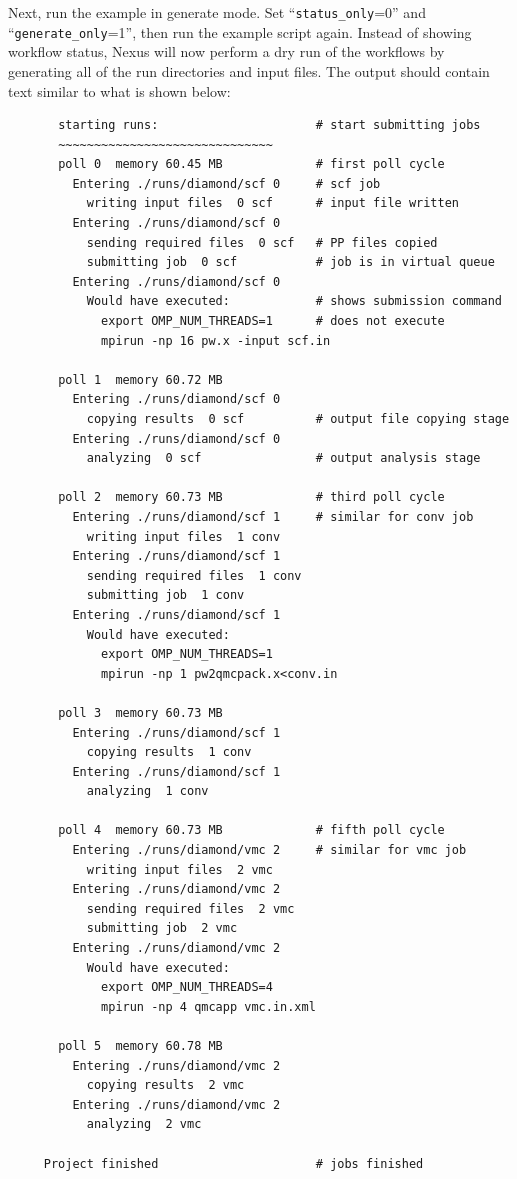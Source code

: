\documentclass[oneside,11pt]{memoir}
\numberwithin{equation}{section}
\begin{document}
Next, run the example in generate mode.  Set ``\texttt{status\_only}=0'' and ``\texttt{generate\_only}=1'', then run the example script again.  Instead of showing workflow status, Nexus will now perform a dry run of the workflows by generating all of the run directories and input files.  The output should contain text similar to what is shown below:
\begin{shaded}
\begin{verbatim}
       starting runs:                      # start submitting jobs
       ~~~~~~~~~~~~~~~~~~~~~~~~~~~~~~ 
       poll 0  memory 60.45 MB             # first poll cycle
         Entering ./runs/diamond/scf 0     # scf job
           writing input files  0 scf      # input file written
         Entering ./runs/diamond/scf 0 
           sending required files  0 scf   # PP files copied
           submitting job  0 scf           # job is in virtual queue
         Entering ./runs/diamond/scf 0 
           Would have executed:            # shows submission command
             export OMP_NUM_THREADS=1      # does not execute
             mpirun -np 16 pw.x -input scf.in 
     
       poll 1  memory 60.72 MB 
         Entering ./runs/diamond/scf 0 
           copying results  0 scf          # output file copying stage
         Entering ./runs/diamond/scf 0 
           analyzing  0 scf                # output analysis stage
     
       poll 2  memory 60.73 MB             # third poll cycle
         Entering ./runs/diamond/scf 1     # similar for conv job
           writing input files  1 conv 
         Entering ./runs/diamond/scf 1 
           sending required files  1 conv 
           submitting job  1 conv 
         Entering ./runs/diamond/scf 1 
           Would have executed:  
             export OMP_NUM_THREADS=1
             mpirun -np 1 pw2qmcpack.x<conv.in 
     
       poll 3  memory 60.73 MB 
         Entering ./runs/diamond/scf 1 
           copying results  1 conv 
         Entering ./runs/diamond/scf 1 
           analyzing  1 conv 
     
       poll 4  memory 60.73 MB             # fifth poll cycle
         Entering ./runs/diamond/vmc 2     # similar for vmc job
           writing input files  2 vmc 
         Entering ./runs/diamond/vmc 2 
           sending required files  2 vmc 
           submitting job  2 vmc 
         Entering ./runs/diamond/vmc 2 
           Would have executed:  
             export OMP_NUM_THREADS=4
             mpirun -np 4 qmcapp vmc.in.xml 
     
       poll 5  memory 60.78 MB 
         Entering ./runs/diamond/vmc 2 
           copying results  2 vmc 
         Entering ./runs/diamond/vmc 2 
           analyzing  2 vmc 
     
     Project finished                      # jobs finished
\end{verbatim}
\end{shaded}
\end{document}

